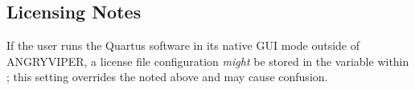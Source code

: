 \begin{flushleft}
\subsection{Licensing Notes}
If the user runs the Quartus software in its native GUI mode outside of ANGRYVIPER, a license file configuration \textit{might} be stored in the variable  within ; this setting overrides the  noted above and may cause confusion.

\end{flushleft}


